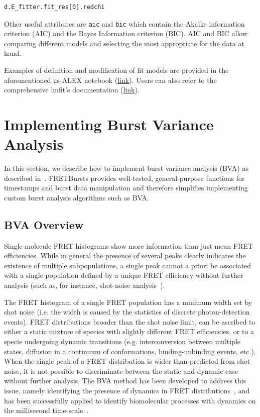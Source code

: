 \documentclass[10pt,letterpaper]{article}
\begin{document}
\begin{lstlisting}
d.E_fitter.fit_res[0].redchi
\end{lstlisting}

Other useful attributes are \verb|aic| and \verb|bic| which contain the
Akaike information criterion (AIC) and the Bayes Information criterion (BIC).
AIC and BIC allow comparing different models and
selecting the most appropriate for the data at hand.

Examples of definition and modification of fit models are provided in
the aforementioned μs-ALEX notebook
(\href{http://nbviewer.jupyter.org/github/tritemio/FRETBursts_notebooks/blob/master/notebooks/FRETBursts%20-%20us-ALEX%20smFRET%20burst%20analysis.ipynb#FRET-fit:-in-depth-example}{link}).
Users can also refer to the comprehensive lmfit's documentation
(\href{http://lmfit.github.io/lmfit-py/}{link}).


\section*{Implementing Burst Variance Analysis}

\label{sec:bva}
In this section, we describe how to implement burst variance analysis (BVA)
as described in~\cite{Torella_2011}.
FRETBursts provides well-tested, general-purpose functions for timestamps and burst data
manipulation and therefore simplifies implementing custom burst analysis algorithms such as BVA.

\subsection*{BVA Overview}
Single-molecule FRET histograms show more information than just mean FRET efficiencies.
While in general the presence of several peaks clearly indicates the existence of
multiple subpopulations, a single peak cannot a priori be associated with
a single population defined by a unique FRET efficiency without further analysis
(such as, for instance, shot-noise analysis~\cite{Nir_2006,Antonik2006}).

The FRET histogram of a single FRET population has a minimum width set by shot noise
(i.e. the width is caused by the statistics of discrete photon-detection events).
FRET distributions broader than the shot noise limit,
can be ascribed to either a static mixture of species with slightly different FRET efficiencies,
or to a specie undergoing dynamic transitions (e.g. interconversion between multiple states,
diffusion in a continuum of conformations, binding-unbinding events, etc.).
When the single peak of a FRET distribution is wider than predicted from shot-noise,
it is not possible to discriminate between the static and dynamic case without further analysis.
The BVA method has been developed to address this issue, namely identifying the presence of dynamics
in FRET distributions~\cite{Torella_2011},
and has been successfully applied to identify biomolecular processes with
dynamics on the millisecond time-scale~\cite{Torella_2011, Robb_2013}.
\end{document}
